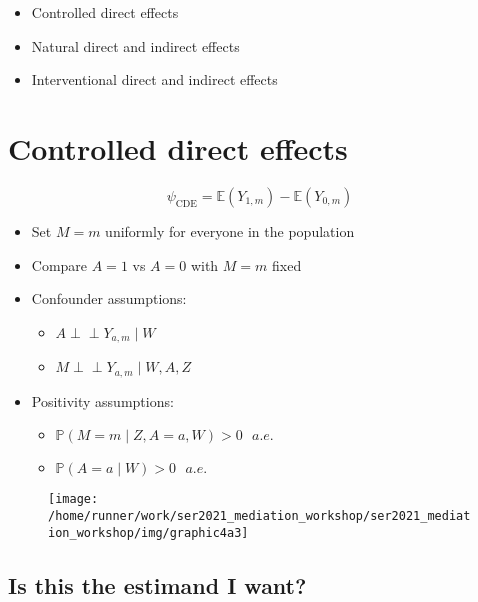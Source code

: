 \documentclass[
  12pt, krantz2,
]{book}
\providecommand{\tightlist}{%
  \setlength{\itemsep}{0pt}\setlength{\parskip}{0pt}}
\theoremstyle{definition}
\theoremstyle{definition}
\theoremstyle{definition}
\newcommand{\indep}{\mbox{$\perp\!\!\!\perp$}}
\renewcommand{\P}{\mathbb{P}}
\newcommand{\E}{\mathbb{E}}
\newcommand{\1}{\mathbbm{1}}
\begin{document}
\begin{itemize}
\tightlist
\item
  Controlled direct effects
\item
  Natural direct and indirect effects
\item
  Interventional direct and indirect effects
\end{itemize}

\hypertarget{controlled-direct-effects}{%
\section{Controlled direct effects}\label{controlled-direct-effects}}

\[  \psi_{\text{CDE}} = \E(Y_{1,m}) - \E(Y_{0,m}) \]

\begin{itemize}
\tightlist
\item
  Set \(M=m\) uniformly for everyone in the population
\item
  Compare \(A=1\) vs \(A=0\) with \(M=m\) fixed
\item
  Confounder assumptions:

  \begin{itemize}
  \tightlist
  \item
    \(A \indep Y_{a,m} \mid W\)
  \item
    \(M \indep Y_{a,m} \mid W, A, Z\)
  \end{itemize}
\item
  Positivity assumptions:

  \begin{itemize}
  \tightlist
  \item
    \(\P(M = m \mid Z, A=a, W) > 0 \text{  } a.e.\)
  \item
    \(\P(A=a \mid W) > 0 \text{  } a.e.\)
  \end{itemize}
\end{itemize}

\begin{figure}

{\centering \texttt{[image: /home/runner/work/ser2021\_mediation\_workshop/ser2021\_mediation\_workshop/img/graphic4a3]} 

}

\end{figure}

\hypertarget{is-this-the-estimand-i-want}{%
\subsection*{Is this the estimand I want?}\label{is-this-the-estimand-i-want}}
\end{document}
